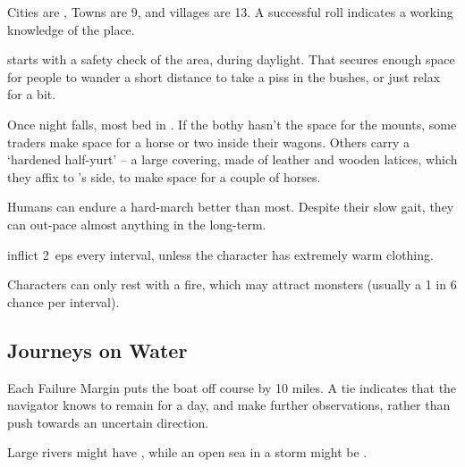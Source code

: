 \begin{multicols}{2}
Cities are \tn[7], Towns are 9, and \glspl{village} are 13.
A successful roll indicates a working knowledge of the place.

starts with a safety check of the area, during daylight.
That secures enough space for people to wander a short distance to take a piss in the bushes, or just relax for a bit.

Once night falls, most bed in .
If the \gls{bothy} hasn't the space for the mounts, some traders make space for a horse or two inside their wagons.
Others carry a `hardened half-yurt' -- a large covering, made of leather and wooden latices, which they affix to 's side, to make space for a couple of horses.


Humans can endure a hard-march better than most.
Despite their slow gait, they can out-pace almost anything in the long-term.%

inflict 2~\glspl{ep} every \gls{interval}, unless the character has extremely warm clothing.

Characters can only rest with a fire, which may attract \glspl{monster} (usually a 1 in 6 chance per \gls{interval}).

\subsection{Journeys on Water}


Each Failure Margin puts the boat off course by 10 miles.
A tie indicates that the navigator knows to remain for a day, and make further observations, rather than push towards an uncertain direction.

Large rivers might have \tn[8], while an open sea in a storm might be \tn[12].


\end{multicols}
